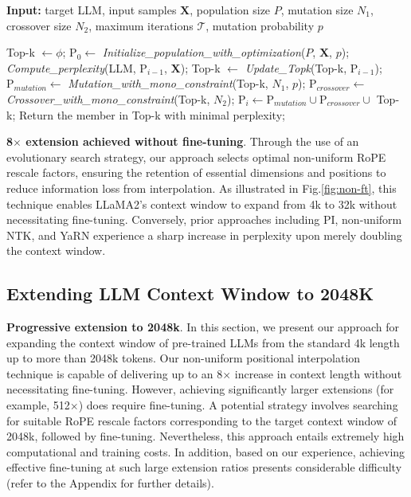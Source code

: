 \begin{algorithm}[t]
	\small
	\caption{The search algorithm}
	\textbf{Input:} target LLM, input samples $\mathbf{X}$, population size $P$, mutation size $N_1$, crossover size $N_2$, maximum iterations $\mathcal{T}$, mutation probability $p$ \\

	\begin{algorithmic}[1]
		\label{alg:search}
		\STATE Top-k $\leftarrow \phi$;	
		\STATE $\text{P}_0 \leftarrow$ \textit{Initialize\_population\_with\_optimization}($P$, $\mathbf{X}$, $p$); 
		\STATE \textit{Compute\_perplexity}(LLM, $\text{P}_{i-1}$, $\mathbf{X}$);
		\STATE Top-k $\leftarrow$ \textit{Update\_Topk}(Top-k, $\text{P}_{i-1}$);
		\STATE $\text{P}_{mutation} \leftarrow$ \textit{Mutation\_with\_mono\_constraint}(Top-k, $N_1$, $p$);
		\STATE $\text{P}_{crossover} \leftarrow$ \textit{Crossover\_with\_mono\_constraint}(Top-k, $N_2$);
		\STATE $\text{P}_i \leftarrow \text{P}_{mutation} \cup \text{P}_{crossover} \cup$ Top-k;
		\ENDFOR
		\STATE Return the member in Top-k with minimal perplexity;
	\end{algorithmic}
\end{algorithm}

\textbf{8$\times$ extension achieved without fine-tuning}. Through the use of an evolutionary search strategy, our approach selects optimal non-uniform RoPE rescale factors, ensuring the retention of essential dimensions and positions to reduce information loss from interpolation. As illustrated in Fig.\ref{fig:non-ft}, this technique enables LLaMA2's context window to expand from 4k to 32k without necessitating fine-tuning. Conversely, prior approaches including PI, non-uniform NTK, and YaRN experience a sharp increase in perplexity upon merely doubling the context window.

\subsection{Extending LLM Context Window to 2048K}
\label{sec:extendto2048k}

\textbf{Progressive extension to 2048k}. In this section, we present our approach for expanding the context window of pre-trained LLMs from the standard 4k length up to more than 2048k tokens. Our non-uniform positional interpolation technique is capable of delivering up to an 8$\times$ increase in context length without necessitating fine-tuning. However, achieving significantly larger extensions (for example, 512$\times$) does require fine-tuning. A potential strategy involves searching for suitable RoPE rescale factors corresponding to the target context window of 2048k, followed by fine-tuning. Nevertheless, this approach entails extremely high computational and training costs. In addition, based on our experience, achieving effective fine-tuning at such large extension ratios presents considerable difficulty (refer to the Appendix for further details).

